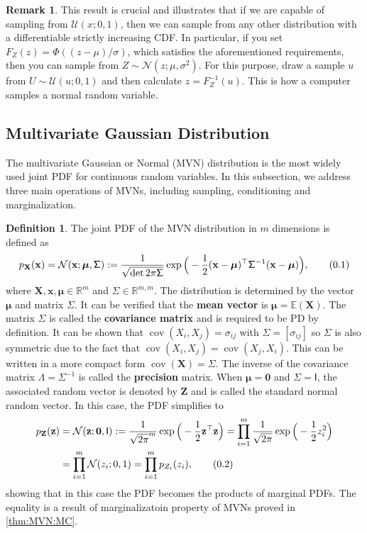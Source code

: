 \documentclass[10pt]{article}
\theoremstyle{definition}
\newtheorem{defn}{Definition}[section]
\newtheorem*{rem}{Remark}
\newcommand\eqnum{\addtocounter{equation}{1}\tag{\arabic{section}.\arabic{equation}}}
\DeclareMathOperator{\cov}{cov}
\begin{document}
\newline
\begin{rem}
This result is crucial and illustrates that if we are capable of sampling from $\mathcal{U}(x; 0, 1)$, then we can sample from any other distribution with a differentiable strictly increasing CDF. In particular, if you set $F_Z(z) = \Phi((z-\mu)/\sigma)$, which satisfies the aforementioned requirements, then you can sample from $Z\sim\mathcal{N}(z; \mu, \sigma^2)$. For this purpose, draw a sample $u$ from $U\sim\mathcal{U}(u; 0, 1)$ and then calculate $z=F_Z^{-1}(u)$. This is how a computer samples a normal random variable.
\end{rem}

\subsection{Multivariate Gaussian Distribution}
The multivariate Gaussian or Normal (MVN) distribution is the most widely used joint PDF for continuous random variables. In this subsection, we address three main operations of MVNs, including sampling, conditioning and marginalization.
\begin{defn}
The joint PDF of the MVN distribution in $m$ dimensions is defined as
\begin{equation*}
p_{\mathbf{X}}(\mathbf{x}) = \mathcal{N}(\mathbf{x};\boldsymbol{\mu},\mathsf{\Sigma}) := 
\frac{1}{\sqrt{\det2\pi\mathsf{\Sigma}}}
\exp\Big(-\frac{1}{2}(\mathbf{x} - \boldsymbol{\mu})^{\top}\mathsf{\Sigma}^{-1}(\mathbf{x} - \boldsymbol{\mu})\Big),
\eqnum
\end{equation*}
where $\mathbf{X}, \mathbf{x}, \boldsymbol{\mu} \in \mathbb{R}^m$ and $\mathsf{\Sigma} \in \mathbb{R}^{m,m}$. The distribution is determined by the vector $\boldsymbol{\mu}$ and matrix $\mathsf{\Sigma}$. It can be verified that the \textbf{mean vector} is $\boldsymbol{\mu}=\mathbb{E}(\mathbf{X})$. The matrix $\mathsf{\Sigma}$ is called the \textbf{covariance matrix} and is required to be PD by definition. It can be shown that $\cov(X_i,X_j)=\mathsf{\sigma}_{ij}$ with $\mathsf{\Sigma}=[\sigma_{ij}]$ so $\mathsf{\Sigma}$ is also symmetric due to the fact that $\cov(X_i,X_j) = \cov(X_j, X_i)$. This can be written in a more compact form $\cov(\mathbf{X})=\mathsf{\Sigma}$. The inverse of the covariance matrix $\mathsf{\Lambda} = \mathsf{\Sigma}^{-1}$ is called the \textbf{precision} matrix. When $\boldsymbol{\mu} = \mathbf{0}$ and $\mathsf{\Sigma} = \mathsf{I}$, the associated random vector is denoted by $\mathbf{Z}$ and is called the standard normal  random vector. In this case, the PDF simplifies to
\begin{align*}
p_{\mathbf{Z}}(\mathbf{z}) &=  \mathcal{N}(\mathbf{z};\boldsymbol{0},\mathsf{I}) := \frac{1}{\sqrt{2\pi}^m}
\exp\Big(-\frac{1}{2}\mathbf{z}^{\top}\mathbf{z}\Big) = 
\prod_{i=1}^{m}\frac{1}{\sqrt{2\pi}}\exp\Big(-\frac{1}{2}z_i^2\Big) \\
&=\prod_{i=1}^{m}\mathcal{N}(z_i; 0, 1)=\prod_{i=1}^{m}p_{Z_i}(z_i),
\eqnum
\label{eq:RanVec:SN}
\end{align*}
showing that in this case the PDF becomes the products of marginal PDFs. The equality is a result of marginalizatoin property of MVNs proved in \cref{thm:MVN:MC}.
\end{defn}
\end{document}
